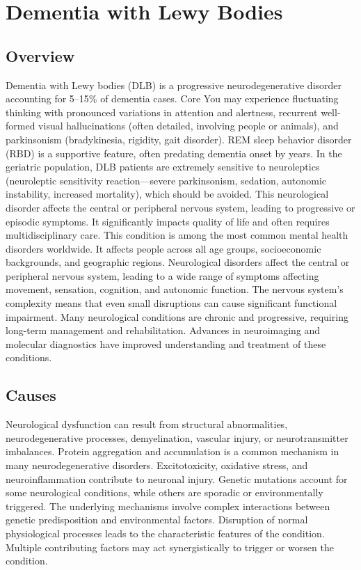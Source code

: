 \chapter{Dementia with Lewy Bodies}
\label{sec:Dementia with Lewy Bodies}

\section{Overview}
Dementia with Lewy bodies (DLB) is a progressive neurodegenerative disorder accounting for 5--15\% of dementia cases. Core You may experience fluctuating thinking with pronounced variations in attention and alertness, recurrent well-formed visual hallucinations (often detailed, involving people or animals), and parkinsonism (bradykinesia, rigidity, gait disorder). REM sleep behavior disorder (RBD) is a supportive feature, often predating dementia onset by years. In the geriatric population, DLB patients are extremely sensitive to neuroleptics (neuroleptic sensitivity reaction---severe parkinsonism, sedation, autonomic instability, increased mortality), which should be avoided. This neurological disorder affects the central or peripheral nervous system, leading to progressive or episodic symptoms. It significantly impacts quality of life and often requires multidisciplinary care. This condition is among the most common mental health disorders worldwide. It affects people across all age groups, socioeconomic backgrounds, and geographic regions. Neurological disorders affect the central or peripheral nervous system, leading to a wide range of symptoms affecting movement, sensation, cognition, and autonomic function. The nervous system's complexity means that even small disruptions can cause significant functional impairment. Many neurological conditions are chronic and progressive, requiring long-term management and rehabilitation. Advances in neuroimaging and molecular diagnostics have improved understanding and treatment of these conditions.
\section{Causes}
Neurological dysfunction can result from structural abnormalities, neurodegenerative processes, demyelination, vascular injury, or neurotransmitter imbalances. Protein aggregation and accumulation is a common mechanism in many neurodegenerative disorders. Excitotoxicity, oxidative stress, and neuroinflammation contribute to neuronal injury. Genetic mutations account for some neurological conditions, while others are sporadic or environmentally triggered. The underlying mechanisms involve complex interactions between genetic predisposition and environmental factors. Disruption of normal physiological processes leads to the characteristic features of the condition. Multiple contributing factors may act synergistically to trigger or worsen the condition.
